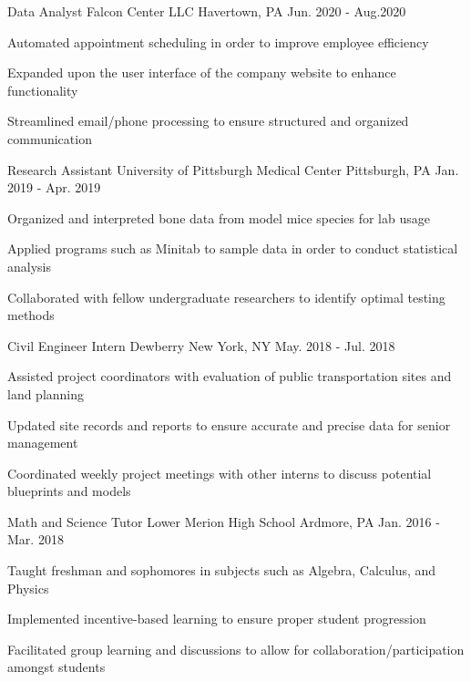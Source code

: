 
\begin{cventries}
  \cventry
    {Data Analyst} %
    {Falcon Center LLC} %
    {Havertown, PA} %
    {Jun. 2020 - Aug.2020} %
    {
      \begin{cvitems} %
        \item {Automated appointment scheduling in order to improve employee efficiency}
        \item {Expanded upon the user interface of the company website to enhance functionality}
        \item {Streamlined email/phone processing to ensure structured and organized communication}
      \end{cvitems}
    }

  \cventry
    {Research Assistant} %
    {University of Pittsburgh Medical Center} %
    {Pittsburgh, PA} %
    {Jan. 2019 - Apr. 2019} %
    {
      \begin{cvitems} %
        \item {Organized and interpreted bone data from model mice species for lab usage}
        \item {Applied programs such as Minitab to sample data in order to conduct statistical analysis}
        \item {Collaborated with fellow undergraduate researchers to identify optimal testing methods}
      \end{cvitems}
    }

  \cventry
    {Civil Engineer Intern} %
    {Dewberry} %
    {New York, NY} %
    {May. 2018 - Jul. 2018} %
    {
      \begin{cvitems} %
        \item {Assisted project coordinators with evaluation of public transportation sites and land planning}
        \item {Updated site records and reports to ensure accurate and precise data for senior management}
        \item {Coordinated weekly project meetings with other interns to discuss potential blueprints and models}
      \end{cvitems}
    }

  \cventry
    {Math and Science Tutor} %
    {Lower Merion High School} %
    {Ardmore, PA} %
    {Jan. 2016 - Mar. 2018} %
    {
      \begin{cvitems} %
        \item {Taught freshman and sophomores in subjects such as Algebra, Calculus, and Physics}
		\item {Implemented incentive-based learning to ensure proper student progression}
		\item {Facilitated group learning and discussions to allow for collaboration/participation amongst students}
      \end{cvitems}
    }

\end{cventries}
